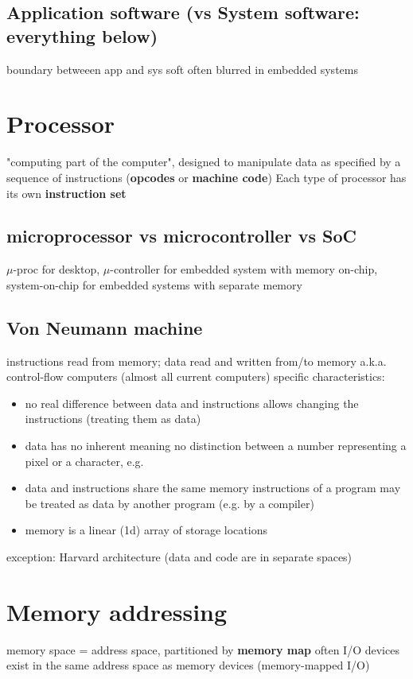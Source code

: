 \documentclass[11pt]{article}
\begin{document}
\subsection{Application software (vs System software: everything below)}
\label{sec:org0297035}
boundary betweeen app and sys soft often blurred in embedded systems

\section{Processor}
\label{sec:org4434539}
"computing part of the computer", designed to manipulate data as specified by
a sequence of instructions (\textbf{\textbf{opcodes}} or \textbf{\textbf{machine code}})
Each type of processor has its own \textbf{\textbf{instruction set}}
\subsection{microprocessor vs microcontroller vs SoC}
\label{sec:orgaaa091b}
\(\mu\)-proc for desktop, \(\mu\)-controller for embedded system with memory on-chip,
system-on-chip for embedded systems with separate memory
\subsection{Von Neumann machine}
\label{sec:org2a9387b}
instructions read from memory; data read and written from/to memory
a.k.a. control-flow computers (almost all current computers)
specific characteristics:
\begin{itemize}
\item no real difference between data and instructions
allows changing the instructions (treating them as data)
\item data has no inherent meaning
no distinction between a number representing a pixel or a character, e.g.
\item data and instructions share the same memory
instructions of a program may be treated as data by another program
(e.g. by a compiler)
\item memory is a linear (1d) array of storage locations
\end{itemize}
exception: Harvard architecture (data and code are in separate spaces)
\section{Memory addressing}
\label{sec:org64862b7}
memory space = address space, partitioned by \textbf{\textbf{memory map}}
often I/O devices exist in the same address space as memory devices
(memory-mapped I/O)
\end{document}
